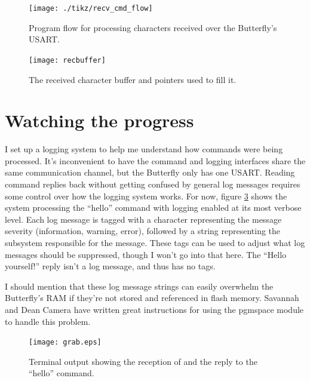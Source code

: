 \begin{figure}[ht]
    \begin{center}
        \texttt{[image: ./tikz/recv\_cmd\_flow]}
        \caption{Program flow for processing characters received over the Butterfly's USART.\label{fig:recflow}}
    \end{center}
\end{figure}

\begin{figure}[ht]
    \begin{center}
        \texttt{[image: recbuffer]}
        \caption{The received character buffer and pointers used to fill it.\label{fig:recbuffer}}
    \end{center}
\end{figure}

\clearpage{}
\section{Watching the progress}
I set up a logging system to help me understand how commands were being processed.  It's inconvenient to have the command and logging interfaces share the same communication channel, but the Butterfly only has one USART.  Reading command replies back without getting confused by general log messages requires some control over how the logging system works.  For now, figure \ref{fig:termgrab} shows the system processing the ``hello'' command with logging enabled at its most verbose level.  Each log message is tagged with a character representing the message severity (information, warning, error), followed by a string representing the subsystem responsible for the message.  These tags can be used to adjust what log messages should be suppressed, though I won't go into that here.  The ``Hello yourself!'' reply isn't a log message, and thus has no tags.

I should mention that these log message strings can easily overwhelm the Butterfly's RAM if they're not stored and referenced in flash memory.  Savannah\cite{url:savannah:pgmspace} and Dean Camera\cite{url:deancamera:pgmspace} have written great instructions for using the pgmspace module to handle this problem.

\begin{figure}[ht]
    \begin{center}
        \texttt{[image: grab.eps]}
        \caption{Terminal output showing the reception of and the reply to the ``hello'' command.\label{fig:termgrab}}
    \end{center}
\end{figure}




